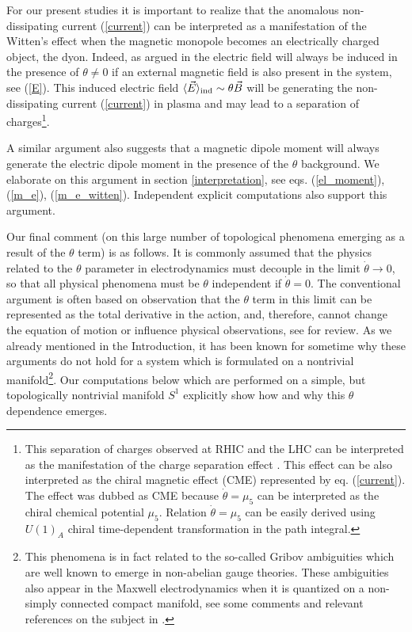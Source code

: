 \documentclass[ twocolumn,aps,prd,   
               preprintnumbers,numbers,sort&compress,nofootinbib,
                            showpacs,superscriptaddress,
               colorlinks,
               linkcolor=blue,   
               citecolor=blue]{revtex4-1}   \newcommand{\exclude}[1]{}
\def\la{\langle}
\def\ra{\rangle}
\begin{document}
 For our present studies it is important to realize that  the anomalous non-dissipating current (\ref{current}) can be interpreted as a manifestation of the Witten's effect \cite{Witten:1979ey} when the magnetic monopole becomes an electrically  charged object, the dyon.  Indeed, as argued  in \cite{Kharzeev:2007tn} the electric field will always be induced in the presence of $\theta\neq 0$ if an external magnetic field is also present in the system, see (\ref{E}). This induced electric field $\la \vec{E}\ra_{\rm ind} \sim \theta \vec{B} $ will be generating the  non-dissipating current (\ref{current}) in plasma and may lead to a separation of charges\footnote{This separation of charges  observed  at RHIC and the LHC can be interpreted as the  manifestation of the charge separation effect \cite{Kharzeev:2007tn,Kharzeev:2009fn,Kharzeev:2015znc}. This effect can be also interpreted as the chiral magnetic effect (CME) represented by eq. (\ref{current}). The effect was dubbed as CME because $\dot{\theta}=\mu_5$ can be interpreted as the chiral chemical potential $\mu_5$. Relation $\dot{\theta}=\mu_5$ can be easily derived using $U(1)_A$ chiral time-dependent transformation in the path integral.}.
   
   
   A similar argument also suggests that a magnetic dipole moment will always generate  the electric dipole moment in the presence of the $\theta$ background. We elaborate on this argument in   section \ref{interpretation}, see eqs. (\ref{el_moment}), (\ref{m_e}), (\ref{m_e_witten}). Independent  explicit computations \cite{Hill:2015kva,Hill:2015vma} also support this argument. 
 
 Our final comment (on this large number of   topological phenomena emerging as a result of    the $\theta$ term) is as follows. It is commonly  assumed that the physics related to the $\theta$ parameter in electrodynamics must decouple in the limit $\dot{\theta}\rightarrow 0$, so that all physical phenomena must be $\theta$ independent if $\dot{\theta}= 0$. The conventional argument is often based on observation that the $\theta$ term in this limit can be represented as the total derivative in the action,  and, therefore, cannot change the equation of motion or influence physical observations, see \cite{Kharzeev:2009fn} for review.  As we already mentioned in the Introduction, it has been known for sometime   \cite{Witten:1995gf,Verlinde:1995mz,Olive:2000yy} why these arguments do not hold for  a system  which is   formulated on a nontrivial manifold\footnote{\label{Gribov}This phenomena is in fact related to the so-called Gribov ambiguities which are well known to  emerge in non-abelian gauge theories.  These ambiguities  also appear in  the Maxwell electrodynamics when it is quantized on a non-simply connected compact manifold,   see some comments and relevant references on the subject in   \cite{Cao:2013na}. }.
Our   computations below which are performed  on a  simple, but topologically nontrivial  manifold $S^1$  explicitly show how and why this $\theta$ dependence emerges. 
\end{document}
